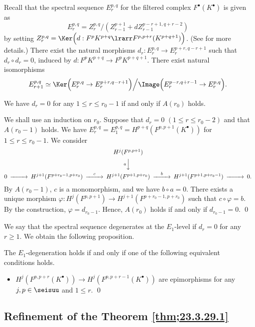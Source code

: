 \documentclass[a4,10pt]{article}
\begin{document}
\vspace{.1in}

Recall that the spectral sequence
$E_r^{p,q}$
for the filtered complex
$F^{\bullet}(K^{\bullet})$
is given as
\[
 E_r^{p,q}
 =Z_r^{p,q}\big/
 (Z_{r-1}^{p+1}+dZ^{p-r+1,q+r-2}_{r-1})
\]
by setting
$Z_r^{p,q}=
 \Ker\Bigl(
 d:F^{p}K^{p+q}\lrarr
 F^{p,p+r}(K^{p+q+1})
 \Bigr)$.
(See \cite{Gelfand-Manin} for more details.)
There exist the natural morphisms
$d_r:E_r^{p,q}\to E_{r}^{p+r,q-r+1}$
such that $d_r\circ d_r=0$,
induced by $d:F^pK^{p+q}\to F^pK^{p+q+1}$.
There exist natural isomorphisms
\[
 E_{r+1}^{p,q}
 \simeq
 \Ker\Bigl(
 E_r^{p,q}\to E_r^{p+r,q-r+1}
 \Bigr)\Big/
 \Image\Bigl(
 E_r^{p-r,q+r-1}
 \to
 E_r^{p,q}
 \Bigr).
\]

\begin{lem}
We have $d_r=0$ for any $1\leq r\leq r_0-1$
if and only if $A(r_0)$ holds.
\end{lem}
\pf
We shall use an induction on $r_0$.
Suppose that
$d_r=0$ $(1\leq r\leq r_0-2)$
and
that $A(r_0-1)$ holds.
We have
$E_r^{p,q}=E_1^{p,q}
=H^{p+q}(F^{p,p+1}(K^{\bullet}))$ for $1\leq r\leq r_0-1$.
We consider
\[
 \begin{CD}
 @. @. H^j(F^{p,p+1})\\
 @. @. @V{a}VV \\
0 @>>>
 H^{j+1}(F^{p+r_0-1,p+r_0})
 @>{c}>>  
 H^{j+1}(F^{p+1,p+r_0})
 @>{b}>>
  H^{j+1}(F^{p+1,p+r_0-1})
  @>>> 0.
\end{CD}
\]
By $A(r_0-1)$, $c$ is a monomorphism,
and we have $b\circ a=0$.
There exists a unique morphism
$\varphi:H^j(F^{p,p+1})\to H^{j+1}(F^{p+r_0-1,p+r_0})$
such that
$c\circ\varphi=b$.
By the construction,
$\varphi=d_{r_0-1}$.
Hence, $A(r_0)$ holds if and only if $d_{r_0-1}=0$.
\hfill\qed


\vspace{.1in}
We say that the spectral sequence degenerates at the $E_1$-level
if $d_r=0$ for any $r\geq 1$.
We obtain the following proposition.
\begin{prop}
The $E_1$-degeneration holds if and only if
one of the following equivalent conditions holds. 
\begin{itemize}
 \item $H^j(F^{p,p+r}(K^{\bullet}))
       \to
       H^j(F^{p,p+r-1}(K^{\bullet}))$
       are epimorphisms for any $j,p\in\seisuu$
      and $1\leq r$.
\hfill\qed
\end{itemize}
\end{prop}


\subsection{Refinement of the Theorem \ref{thm;23.3.29.1}}
\end{document}
